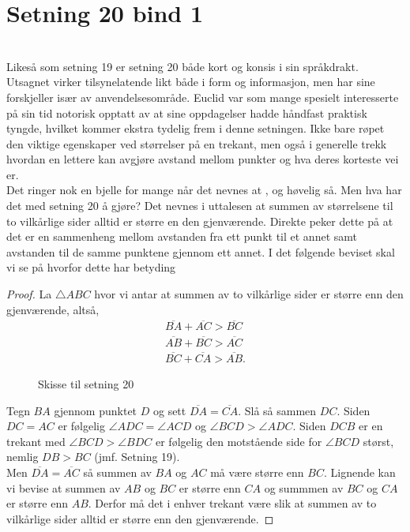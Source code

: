 \documentclass[12pt,
               a4paper,
               article,
               oneside,
               oldfontcommands,
               norsk]{memoir}
\begin{document}
\section{\large Setning 20 bind 1}
\vspace{3mm}\\ 
Likeså som setning 19 er setning 20 både kort og konsis i sin språkdrakt. Utsagnet virker tilsynelatende likt både i form og informasjon, men har sine forskjeller især av anvendelsesområde. Euclid var som mange spesielt interesserte på sin tid notorisk opptatt av at sine oppdagelser hadde håndfast praktisk tyngde, hvilket kommer ekstra tydelig frem i denne setningen. Ikke bare røpet den viktige egenskaper ved størrelser på en trekant, men også i generelle trekk hvordan en lettere kan avgjøre avstand mellom punkter og hva deres korteste vei er. \vspace{4mm}\\ 
Det ringer nok en bjelle for mange når det nevnes at , og høvelig så. Men hva har det med setning 20 å gjøre? Det nevnes i uttalesen at summen av størrelsene til to vilkårlige sider alltid er større en den gjenværende. Direkte peker dette på at det er en sammenheng mellom avstanden fra ett punkt til et annet samt avstanden til de samme punktene gjennom ett annet. I det følgende beviset skal vi se på hvorfor dette har betyding 
\begin{proof}
  La $\triangle ABC$ hvor vi antar at summen av to vilkårlige sider er større enn den gjenværende, altså, 
\begin{align*}
\overline{BA} + \overline{AC} > \overline{BC}\\[5pt] 
\overline{AB} + \overline{BC} > \overline{AC} \\[5pt] 
\overline{BC} + \overline{CA} > \overline{AB}.
\end{align*}
\begin{figure}[H]
\centering 

\caption{Skisse til setning 20}
\end{figure}
Tegn $BA$ gjennom punktet $D$ og sett $\overline{DA} = \overline{CA}$. Slå så sammen $DC$. Siden $DC = AC$ er følgelig $\angle ADC = \angle ACD$ og $\angle BCD > \angle ADC$. Siden $DCB$ er en trekant med $\angle BCD > \angle BDC$ er følgelig den motstående side for $\angle BCD$ størst, nemlig $DB > BC$ (jmf. Setning 19). \vspace{3mm}\\
Men $\overline{DA} = \overline{AC}$ så summen av $BA$ og $AC$ må være større enn $BC$. Lignende kan vi bevise at summen av $AB$ og $BC$ er større enn $CA$ og summmen av $BC$ og $CA$ er større enn $AB$. Derfor må det i enhver trekant være slik at summen av to vilkårlige sider alltid er større enn den gjenværende.
\end{proof}\cite{Prop_20}
\end{document}
